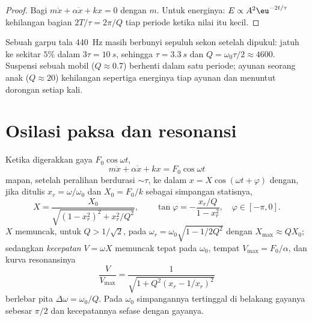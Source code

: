 \begin{proof}
Bagi $m\ddot x + \alpha\dot x + kx = 0$ dengan $m$. Untuk energinya: $E
\propto A^2\eu^{-2t/\tau}$ kehilangan bagian $2T/\tau = 2\pi/Q$ tiap
periode ketika nilai itu kecil.
\end{proof}

\begin{example}\label{ex:b1:oscillators-resonance:ringing}
Sebuah garpu tala \qty{440}{Hz} masih berbunyi sepuluh sekon setelah
dipukul:  jatuh ke sekitar $5\%$ dalam $3\tau = \qty{10}{s}$,
sehingga $\tau = \qty{3.3}{s}$ dan $Q = \omega_0\tau/2 \approx 4600$.
Suspensi sebuah mobil ($Q \approx 0.7$) berhenti dalam satu periode;
ayunan seorang anak ($Q \approx 20$) kehilangan sepertiga energinya tiap
ayunan dan menuntut dorongan setiap kali.
\end{example}

\section{Osilasi paksa dan resonansi}

\begin{theorem}\label{thm:b1:oscillators-resonance:forced}
Ketika digerakkan gaya $F_0\cos\omega t$, 
\[
m\ddot x + \alpha\dot x + kx = F_0\cos\omega t
\]
mapan, setelah peralihan berdurasi $\sim\tau$, ke dalam 
$x = X\cos(\omega t + \varphi)$ dengan, jika ditulis $x_r = \omega/\omega_0$
dan $X_0 = F_0/k$ sebagai simpangan statisnya,
\[
X = \frac{X_0}{\sqrt{(1 - x_r^2)^2 + x_r^2/Q^2}}, \qquad
\tan\varphi = -\frac{x_r/Q}{1 - x_r^2}, \quad \varphi \in [-\pi, 0] .
\]
\emph{} $X$ memuncak, untuk $Q > 1/\sqrt2$, pada $\omega_r =
\omega_0\sqrt{1 - 1/2Q^2}$ dengan $X_{\max} \approx QX_0$; sedangkan
\emph{ kecepatan} $V = \omega X$ memuncak tepat pada $\omega_0$,
tempat $V_{\max} =
F_0/\alpha$, dan kurva resonansinya
\[
\frac{V}{V_{\max}} = \frac{1}{\sqrt{1 + Q^2(x_r - 1/x_r)^2}}
\]
berlebar pita $\Delta\omega = \omega_0/Q$. Pada $\omega_0$ simpangannya
tertinggal di belakang gayanya sebesar $\pi/2$ dan kecepatannya sefase
dengan gayanya.
\end{theorem}

